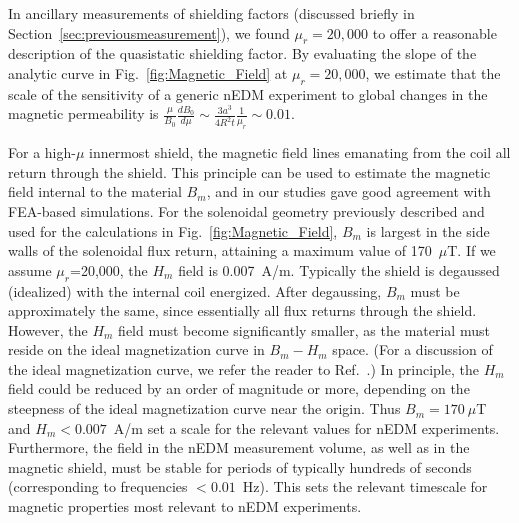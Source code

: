 In ancillary measurements of shielding factors (discussed briefly in
Section~\ref{sec:previousmeasurement}), we found $\mu_r=20,000$ to
offer a reasonable description of the quasistatic shielding factor. By
evaluating the slope of the analytic curve in
Fig.~\ref{fig:Magnetic_Field} at $\mu_r=20,000$, we estimate that the
scale of the sensitivity of a generic nEDM experiment to global
changes in the magnetic permeability is
$\frac{\mu}{B_0}\frac{dB_0}{d\mu} \sim \frac{3 a^3 }{4R^2 t}
\frac{1}{\mu_r} \sim 0.01$.

For a high-$\mu$ innermost shield, the magnetic field lines emanating
from the coil all return through the shield.  This principle can be
used to estimate the magnetic field internal to the material $B_m$,
and in our studies gave good agreement with FEA-based simulations.
For the solenoidal geometry previously described and used for the
calculations in Fig.~\ref{fig:Magnetic_Field}, $B_m$ is largest in the
side walls of the solenoidal flux return, attaining a maximum value of
170~$\mu$T.  If we assume $\mu_r$=20,000, the $H_m$ field is
0.007~A/m.  Typically the shield is degaussed (idealized) with the
internal coil energized.  After degaussing, $B_m$ must be
approximately the same, since essentially all flux returns through the
shield.  However, the $H_m$ field must become significantly smaller,
as the material must reside on the ideal magnetization curve in
$B_m-H_m$ space.  (For a discussion of the ideal magnetization curve,
we refer the reader to Ref.~\cite{bib:bozorth}.)  In principle, the
$H_m$ field could be reduced by an order of magnitude or more,
depending on the steepness of the ideal magnetization curve near the
origin.  Thus $B_m=170~\mu$T and $H_m<0.007$~A/m set a scale for the
relevant values for nEDM experiments.  Furthermore, the field in the
nEDM measurement volume, as well as in the magnetic shield, must be
stable for periods of typically hundreds of seconds (corresponding to
frequencies $<0.01$~Hz).  This sets the relevant timescale for
magnetic properties most relevant to nEDM experiments.
